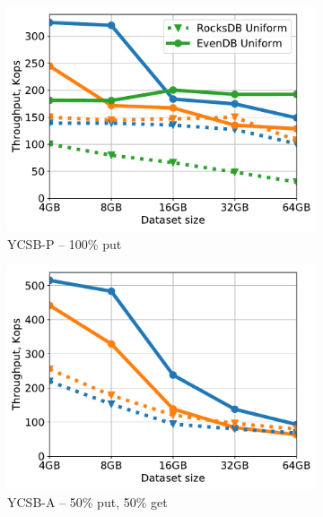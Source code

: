 \begin{figure}[tb]
\centering
\begin{subfigure}{0.33\linewidth}
\includegraphics[width=\textwidth]{figs/Workload_P_line.pdf}
\caption{YCSB-P -- 100\% put}
\label{fig:throughput:p}
\end{subfigure}
\begin{subfigure}{0.33\linewidth}
\includegraphics[width=\textwidth]{figs/Workload_A_line.pdf}
\caption{YCSB-A -- 50\% put, 50\% get}
\label{fig:throughput:a}
\end{subfigure}
\begin{subfigure}{0.33\linewidth}

\end{subfigure}
\end{figure}
